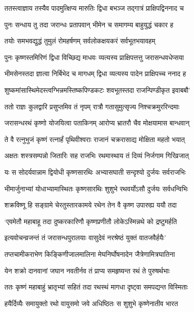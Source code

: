 \twolineshloka
{ततस्त्वाज्ञाय तस्यैव पादमुत्क्षिप्य मारुतिः}
{द्विधा बभञ्ज तद्गात्रं प्राक्षिपद्विननाद च}


\twolineshloka
{पुनः सन्धाय तु तदा जरान्धः प्रतापवान्}
{भीमेन च समागम्य बाहुयुद्धं चकार ह}


\twolineshloka
{तयोः समभवद्युद्धं तुमुलं रोमहर्षणम्}
{सर्वलोकक्षयकरं सर्वभूतभयावहम्}


\twolineshloka
{पुनः कृष्णस्तमिरिणं द्विधा विच्छिद्य माधवः}
{व्यत्यस्य प्राक्षिपत्तत्तु जरासन्धवधेप्सया}


\twolineshloka
{भीमसेनस्तदा ज्ञात्वा निर्बिभेद च मागधम्}
{द्विधा व्यत्यस्य पादेन प्राक्षिपच्च ननाद ह}


\twolineshloka
{शुष्कमांसास्थिमेदस्त्वग्भिन्नमस्तिष्कपिण्डकटः}
{शवभूतस्तदा राजन्पिण्डीकृत इवाबबौ'}


\twolineshloka
{ततो राज्ञः कुलद्वारि प्रसुप्तमिव तं नृपम्}
{रात्रौ गतासुमुत्सृज्य निश्चक्रमुररिन्दमाः}


\twolineshloka
{जरासन्धरथं कृष्णो योजयित्वा पताकिनम्}
{आरोप्य भ्रातरौ चैव मोक्षयामास बान्धवान्}


\twolineshloka
{ते वै रत्नुभुजं कृष्णं रत्नार्हं पृथिवीश्वराः}
{राजानं चक्ररासाद्य मोक्षिता महतो भयात्}


\twolineshloka
{अक्षतः शस्त्रसम्पन्नो जितारिः सह राजभिः}
{रथमास्थाय तं दिव्यं निर्जगाम गिरिव्रजात्}


\twolineshloka
{यः स सोदर्यवान्नाम द्वियोधी कृष्णसारथिः}
{अभ्यासघाती सन्दृश्यो दुर्जयः सर्वराजभिः}


\twolineshloka
{भीमार्जुनाभ्यां योधाभ्यामास्थितः कृष्णसारथिः}
{शुशुभे रथवर्योऽसौ दुर्जयः सर्वधन्विभिः}


\twolineshloka
{शक्रविष्णू हि सङ्ग्रामे चेरतुस्तारकामये}
{रथेन तेन वै कृष्ण उपारुह्य ययौ तदा}


\twolineshloka
{`एवमेतौ महाबाहू तदा दुष्करकारिणौ}
{कृष्णप्रणीतौ लोकेऽस्मिन्नथे को द्रष्टुमर्हति}


\twolineshloka
{इत्यवोचन्व्रजन्तं तं जरासन्धपुरालयाः}
{वासुदेवं नरश्रेष्ठं युक्तं वातजवैर्हयैः'}


\twolineshloka
{तप्तचामीकराभेण किङ्किणीजालमालिना}
{मेघनिर्घोषनादेन जैत्रेणामित्रघातिना}


\twolineshloka
{येन शक्रो दानवानां जघान नवतीर्नव}
{तं प्राप्य समहृष्यन्त रथं ते पुरुषर्थभाः}


\twolineshloka
{ततः कृष्णं महाबाहुं भ्रातृभ्यां सहितं तदा}
{रथस्थं मागधा दृष्ट्वा समपद्यन्त विस्मिताः}


\twolineshloka
{हयैर्दिव्यैः समायुक्तो रथो वायुसमो जवे}
{अधिष्ठितः स शुशुभे कृष्णेनातीव भारत}


